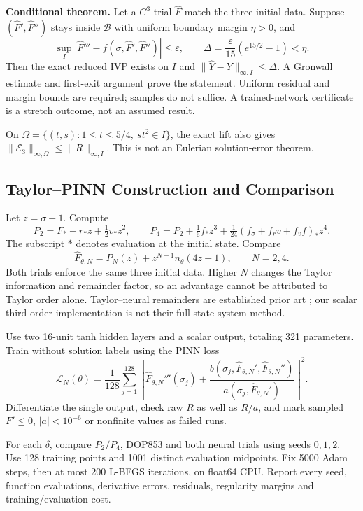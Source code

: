 \documentclass[12pt,a4paper]{article}
\newcommand{\E}{\mathcal E}
\begin{document}
\textbf{Conditional theorem.} Let a $C^3$ trial $\widehat F$ match the three initial data. Suppose $(\widehat F',\widehat F'')$ stays inside $\mathcal B$ with uniform boundary margin $\eta>0$, and
\[
\sup_I|\widehat F'''-f(\sigma,\widehat F',\widehat F'')|\le\varepsilon,
\qquad
\Delta=\frac{\varepsilon}{15}(e^{15/2}-1)<\eta.
\]
Then the exact reduced IVP exists on $I$ and
$\|\widehat Y-Y\|_{\infty,I}\le\Delta$. A Gronwall estimate and first-exit argument prove the statement. Uniform residual and margin bounds are required; samples do not suffice. A trained-network certificate is a stretch outcome, not an assumed result.

On $\Omega=\{(t,s):1\le t\le5/4,\ st^2\in I\}$, the exact lift also gives
$\|\E_3\|_{\infty,\Omega}\le\|R\|_{\infty,I}$. This is not an Eulerian solution-error theorem.

\newpage
\subsection{Taylor--PINN Construction and Comparison}
Let $z=\sigma-1$. Compute
\[
P_2=F_*+r_*z+\tfrac12v_*z^2,\qquad
P_4=P_2+\tfrac16 f_*z^3+
\tfrac1{24}(f_\sigma+f_rv+f_vf)_*z^4.
\]
The subscript $*$ denotes evaluation at the initial state. Compare
\[
\widehat F_{\theta,N}=P_N(z)+z^{N+1}n_\theta(4z-1),\qquad N=2,4.
\]
Both trials enforce the same three initial data. Higher $N$ changes the Taylor information and remainder factor, so an advantage cannot be attributed to Taylor order alone. Taylor--neural remainders are established prior art \cite{taylor}; our scalar third-order implementation is not their full state-system method.

Use two 16-unit tanh hidden layers and a scalar output, totaling 321 parameters. Train without solution labels using the PINN loss \cite{pinn}
\[
\mathcal L_N(\theta)=\frac1{128}\sum_{j=1}^{128}
\left[\widehat F_{\theta,N}'''(\sigma_j)+
\frac{b(\sigma_j,\widehat F_{\theta,N}',\widehat F_{\theta,N}'')}
{a(\sigma_j,\widehat F_{\theta,N}')}\right]^2.
\]
Differentiate the single output, check raw $R$ as well as $R/a$, and mark sampled $F'\le0$, $|a|<10^{-6}$ or nonfinite values as failed runs.

For each $\delta$, compare $P_2/P_4$, DOP853 and both neural trials using seeds $0,1,2$. Use 128 training points and 1001 distinct evaluation midpoints. Fix 5000 Adam steps, then at most 200 L-BFGS iterations, on float64 CPU. Report every seed, function evaluations, derivative errors, residuals, regularity margins and training/evaluation cost.
\end{document}
